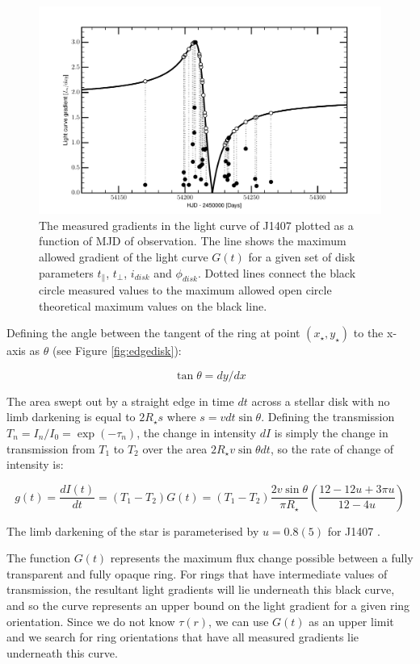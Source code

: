 \documentclass{emulateapj}
\newcommand{\tb}{t_\bot}
\newcommand{\tp}{t_\parallel}
\newcommand{\id}{i_{disk}}
\newcommand{\pd}{\phi_{disk}}
\newcommand{\taur}{\tau(r)}
\begin{document}
\begin{figure}
\centering
\includegraphics[width=\hsize]{fig3}

\caption{The measured gradients in the light curve of J1407 plotted as a function of MJD of observation.
The line shows the maximum allowed gradient of the light curve $G(t)$ for a
given set of disk parameters $\tp$, $\tb$, $\id$ and $\pd$.
Dotted lines connect the black circle measured values to the maximum
allowed open circle theoretical maximum values on the black line.
\label{fig:diskfit}}

\end{figure}

Defining the angle between the tangent of the ring at point $(x_\star,y_\star)$ to
the x-axis as $\theta$ (see Figure \ref{fig:edgedisk}):

$$ \tan \theta = dy/dx $$

The area swept out by a straight edge in time $dt$ across a stellar disk
with no limb darkening is equal to $2R_\star
s$ where $s= v dt \sin \theta$.
Defining the transmission $T_n = I_n/I_0
= \exp(-\tau_n)$, the change in intensity $dI$ is simply the change in
transmission from $T_1$ to $T_2$ over the area $2R_\star v \sin \theta
dt$, so the rate of change of intensity is:

\begin{equation}
g(t) = \frac{dI(t)}{dt} = (T_1 - T_2) G(t) = (T_1 - T_2) \frac{2v \sin
\theta}{\pi R_\star} \left ( \frac{12-12u+3\pi u}{12-4u} \right )
\label{gt}
\end{equation}

The limb darkening of the star is parameterised by $u=0.8(5)$ for J1407
\citep{Claret11}.

The function $G(t)$ represents the maximum flux change possible between a
fully transparent and fully opaque ring.
For rings that have intermediate values of transmission, the resultant
light gradients will lie underneath this black curve, and so the curve
represents an upper bound on the light gradient for a given ring
orientation.
Since we do not know $\taur$, we can use $G(t)$ as an upper limit
and we search for ring orientations that have all measured gradients lie
underneath this curve.
\end{document}
